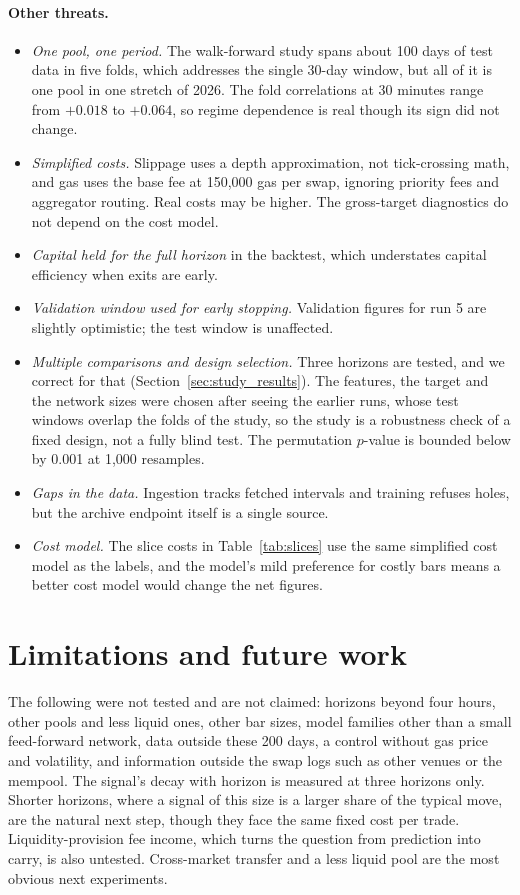 \documentclass[11pt,a4paper]{article}
\begin{document}
\paragraph{Other threats.}
\begin{itemize}
\item \emph{One pool, one period.} The walk-forward study spans about 100
  days of test data in five folds, which addresses the single 30-day window,
  but all of it is one pool in one stretch of 2026. The fold correlations at
  30 minutes range from $+0.018$ to $+0.064$, so regime dependence is real
  though its sign did not change.
\item \emph{Simplified costs.} Slippage uses a depth approximation, not
  tick-crossing math, and gas uses the base fee at 150,000 gas per swap,
  ignoring priority fees and aggregator routing. Real costs may be higher.
  The gross-target diagnostics do not depend on the cost model.
\item \emph{Capital held for the full horizon} in the backtest, which
  understates capital efficiency when exits are early.
\item \emph{Validation window used for early stopping.} Validation figures
  for run 5 are slightly optimistic; the test window is unaffected.
\item \emph{Multiple comparisons and design selection.} Three horizons are
  tested, and we correct for that (Section~\ref{sec:study_results}). The
  features, the target and the network sizes were chosen after seeing the
  earlier runs, whose test windows overlap the folds of the study, so the
  study is a robustness check of a fixed design, not a fully blind test.
  The permutation $p$-value is bounded below by 0.001 at 1,000 resamples.
\item \emph{Gaps in the data.} Ingestion tracks fetched intervals and
  training refuses holes, but the archive endpoint itself is a single source.
\item \emph{Cost model.} The slice costs in Table~\ref{tab:slices} use the
  same simplified cost model as the labels, and the model's mild preference
  for costly bars means a better cost model would change the net figures.
\end{itemize}

\section{Limitations and future work}

The following were not tested and are not claimed: horizons beyond four
hours, other pools and less liquid ones, other bar sizes, model families other
than a small feed-forward network, data outside these 200 days, a control
without gas price and volatility, and information outside the swap logs such
as other venues or the mempool. The signal's decay with horizon is measured at
three horizons only. Shorter horizons, where a signal of this size is a larger
share of the typical move, are the natural next step, though they face the same
fixed cost per trade. Liquidity-provision fee income, which turns
the question from prediction into carry, is also untested. Cross-market
transfer and a less liquid pool are the most obvious next experiments.
\end{document}
